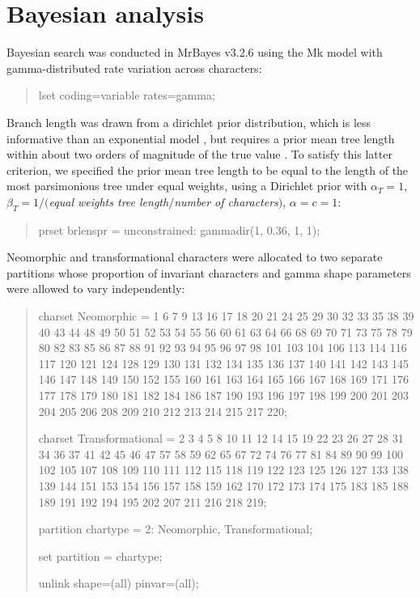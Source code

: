 \documentclass[openany]{book}
\theoremstyle{definition}
\theoremstyle{definition}
\theoremstyle{definition}
\theoremstyle{remark}
\begin{document}
\hypertarget{bayesian}{\chapter{Bayesian analysis}\label{bayesian}}

Bayesian search was conducted in MrBayes v3.2.6 \citep{Ronquist2012}
using the Mk model \citep{Lewis2001} with gamma-distributed rate
variation across characters:

\begin{quote}
lset coding=variable rates=gamma;
\end{quote}

Branch length was drawn from a dirichlet prior distribution, which is
less informative than an exponential model \citep{Rannala2012}, but
requires a prior mean tree length within about two orders of magnitude
of the true value \citep{Zhang2012}. To satisfy this latter criterion,
we specified the prior mean tree length to be equal to the length of the
most parsimonious tree under equal weights, using a Dirichlet prior with
\(\alpha_T = 1\), \(\beta_T = 1/(\)\emph{equal weights tree
length}\(/\)\emph{number of characters}\()\), \(\alpha = c = 1\):

\begin{quote}
prset brlenspr = unconstrained: gammadir(1, 0.36, 1, 1);
\end{quote}

Neomorphic and transformational characters
\citep[\emph{sensu}][]{Sereno2007} were allocated to two separate
partitions whose proportion of invariant characters and gamma shape
parameters were allowed to vary independently:

\begin{quote}
charset Neomorphic = 1 6 7 9 13 16 17 18 20 21 24 25 29 30 32 33 35 38
39 40 43 44 48 49 50 51 52 53 54 55 56 60 61 63 64 66 68 69 70 71 73 75
78 79 80 82 83 85 86 87 88 91 92 93 94 95 96 97 98 101 103 104 106 113
114 116 117 120 121 124 128 129 130 131 132 134 135 136 137 140 141 142
143 145 146 147 148 149 150 152 155 160 161 163 164 165 166 167 168 169
171 176 177 178 179 180 181 182 184 186 187 190 193 196 197 198 199 200
201 203 204 205 206 208 209 210 212 213 214 215 217 220;

charset Transformational = 2 3 4 5 8 10 11 12 14 15 19 22 23 26 27 28 31
34 36 37 41 42 45 46 47 57 58 59 62 65 67 72 74 76 77 81 84 89 90 99 100
102 105 107 108 109 110 111 112 115 118 119 122 123 125 126 127 133 138
139 144 151 153 154 156 157 158 159 162 170 172 173 174 175 183 185 188
189 191 192 194 195 202 207 211 216 218 219;

partition chartype = 2: Neomorphic, Transformational;

set partition = chartype;

unlink shape=(all) pinvar=(all);
\end{quote}
\end{document}

